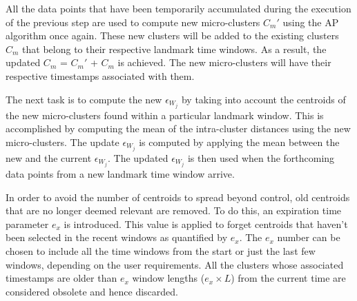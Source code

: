     
    
    
    
    All the data points that have been temporarily accumulated during the execution of the previous step are used to compute new micro-clusters $C_m'$ using the AP algorithm once again. These new clusters will be added to the existing clusters $C_m$ that belong to their respective landmark time windows. As a result, the updated $C_m$ = $C_m'$ + $C_m$ is achieved. The new micro-clusters will have their respective timestamps associated with them.
    

    The next task is to compute the new $\epsilon_{W_j}$ by taking into account the centroids of the new micro-clusters found within a particular landmark window. This is accomplished by computing the mean of the intra-cluster distances using the new micro-clusters. The update $\epsilon_{W_j}$ is computed by applying the mean between the new and the current $\epsilon_{W_j}$. The updated $\epsilon_{W_j}$ is then used when the forthcoming data points from a new landmark time window arrive.
    
    
  
    
    

   In order to avoid the number of centroids to spread beyond control, old centroids that are no longer deemed relevant are removed. To do this, an expiration time parameter $e_x$ is introduced. This value is applied to forget centroids that haven't been selected in the recent windows as quantified by $e_x$. The $e_x$ number can be chosen to include all the time windows from the start or just the last few windows, depending on the user requirements. All the clusters whose associated timestamps are older than $e_x$ window lengths ($e_x \times L$) from the current time are considered obsolete and hence discarded. 
   

